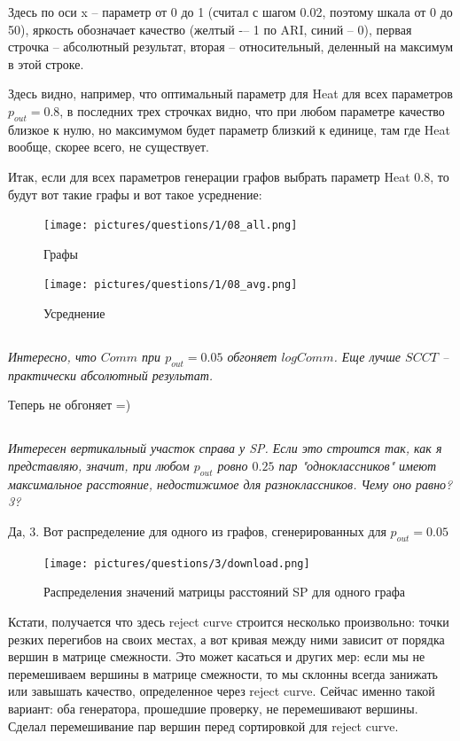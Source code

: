 \documentclass{article}
\begin{document}
Здесь по оси x -- параметр от 0 до 1 (считал с шагом 0.02, поэтому шкала от 0 до 50), яркость обозначает качество (желтый -– 1 по ARI, синий -- 0), первая строчка -- абсолютный результат, вторая – относительный, деленный на максимум в этой строке. 

Здесь видно, например, что оптимальный параметр для Heat для всех параметров $p_{out} = 0.8$, в последних трех строчках видно, что при любом параметре качество близкое к нулю, но максимумом будет параметр близкий к единице, там где Heat вообще, скорее всего, не существует.

Итак, если для всех параметров генерации графов выбрать параметр Heat 0.8, то будут вот такие графы и вот такое усреднение:

\begin{figure}[H]
	\texttt{[image: pictures/questions/1/08\_all.png]}
	\caption{\label{f_vs2} Графы}
\end{figure}

\begin{figure}[H]
	\texttt{[image: pictures/questions/1/08\_avg.png]}
	\caption{\label{f_vs2} Усреднение}
\end{figure}  

\subsection{}
\textit{Интересно, что $Comm$ при $p_{out} = 0.05$ обгоняет $logComm$. Еще лучше $SCCT$ -- практически абсолютный результат.}

Теперь не обгоняет =)


\subsection{}
\textit{Интересен вертикальный участок справа у SP. Если это строится так, как я представляю, значит, при любом $p_{out}$ ровно $0.25$ пар "одноклассников" имеют максимальное расстояние, недостижимое для разноклассников. Чему оно равно? 3?}

Да, 3. Вот распределение для одного из графов, сгенерированных для $p_{out} = 0.05$
\begin{figure}[H]
	\texttt{[image: pictures/questions/3/download.png]}
	\caption{\label{f_vs2} Распределения значений матрицы расстояний SP для одного графа}
\end{figure}
Кстати, получается что здесь reject curve строится несколько произвольно: точки резких перегибов на своих местах, а вот кривая между ними зависит от порядка вершин в матрице смежности. Это может касаться и других мер: если мы не перемешиваем вершины в матрице смежности, то мы склонны всегда занижать или завышать качество, определенное через reject curve. Сейчас именно такой вариант: оба генератора, прошедшие проверку, не перемешивают вершины.
Сделал перемешивание пар вершин перед сортировкой для reject curve. 
\end{document}
